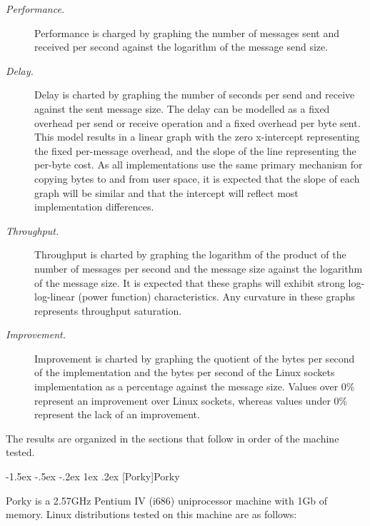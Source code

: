 \documentclass[letterpaper,final,notitlepage,twocolumn,10pt,twoside]{article}
\makeatletter
\renewcommand\subsection{\@startsection{subsection}{2}{\z@}%
                                     {-1.5ex \@plus -.5ex \@minus -.2ex}%
                                     {1ex \@plus .2ex}%
                                     {\normalfont\normalsize\bfseries}}
\makeatother
\begin{document}
\begin{description}

\item[{\it Performance.}]

Performance is charged by graphing the number of messages sent and received
per second against the logarithm of the message send size.

\item[{\it Delay.}]

Delay is charted by graphing the number of seconds per send and receive
against the sent message size.  The delay can be modelled as a fixed
overhead per send or receive operation and a fixed overhead per byte sent.
This model results in a linear graph with the zero x-intercept representing
the fixed per-message overhead, and the slope of the line representing the
per-byte cost.  As all implementations use the same primary mechanism for
copying bytes to and from user space, it is expected that the slope of each
graph will be similar and that the intercept will reflect most implementation
differences.

\item[{\it Throughput.}]

Throughput is charted by graphing the logarithm of the product of the number
of messages per second and the message size against the logarithm of the
message size.  It is expected that these graphs will exhibit strong
log-log-linear (power function) characteristics.  Any curvature in these
graphs represents throughput saturation.

\item[{\it Improvement.}]

Improvement is charted by graphing the quotient of the bytes per second of
the implementation and the bytes per second of the Linux sockets
implementation as a percentage against the message size.  Values over 0\%
represent an improvement over Linux sockets, whereas values under 0\%
represent the lack of an improvement.

\end{description}

The results are organized in the sections that follow in order of the machine
tested.

\subsection[Porky]{Porky}

Porky is a 2.57GHz Pentium IV (i686) uniprocessor machine with 1Gb of memory.
Linux distributions tested on this machine are as follows:
\end{document}
